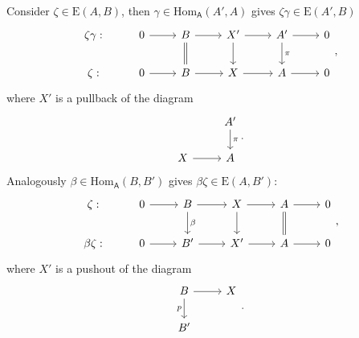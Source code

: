 \begin{rem}[]
	Consider $\zeta \in \mathrm{E}(A,B)$,
	then $\gamma \in \mathrm{Hom}_{\mathsf{A}} \left( A', A \right)$
	gives $\zeta\gamma \in \mathrm{E}(A',B)$
	\begin{equation}
	\begin{tikzcd}
		\zeta\gamma: &
		0 \arrow[r, "", rightarrow] &
		B \arrow[r, "", rightarrow] \arrow[d, "", equal] &
		X' \arrow[r, "", rightarrow] \arrow[d, "", rightarrow] &
		A' \arrow[r, "", rightarrow] \arrow[d, "\pi", rightarrow] &
		0\\
		\zeta: &
		0 \arrow[r, "", rightarrow] &
		B \arrow[r, "", rightarrow] &
		X \arrow[r, "", rightarrow] &
		A \arrow[r, "", rightarrow] &
		0
	\end{tikzcd}
	,\end{equation} 
	where $X'$ is a pullback of the diagram
	\begin{equation}
	\begin{tikzcd}
		& A' \arrow[d, "\pi", rightarrow] \\
		X \arrow[r, "", rightarrow] & A
	\end{tikzcd}
	.\end{equation} 
	Analogously $\beta \in \mathrm{Hom}_{\mathsf{A}} \left( B, B' \right)$ gives
	$\beta\zeta \in \mathrm{E}(A,B')$:
	\begin{equation}
	\begin{tikzcd}
		\zeta: &
		0 \arrow[r, "", rightarrow] &
		B \arrow[r, "", rightarrow] \arrow[d, "\beta", rightarrow] &
		X \arrow[r, "", rightarrow] \arrow[d, "", rightarrow] &
		A \arrow[r, "", rightarrow] \arrow[d, "", equal] &
		0\\
		\beta\zeta: &
		0 \arrow[r, "", rightarrow] &
		B' \arrow[r, "", rightarrow] &
		X' \arrow[r, "", rightarrow] &
		A \arrow[r, "", rightarrow] &
		0
	\end{tikzcd}
	,\end{equation} 
	where $X'$ is a pushout of the diagram
	\begin{equation}
	\begin{tikzcd}
		B \arrow[r, "", rightarrow] \arrow[d, "p"', rightarrow] & X\\
		B' &
	\end{tikzcd}
	.\end{equation} 
\end{rem}


